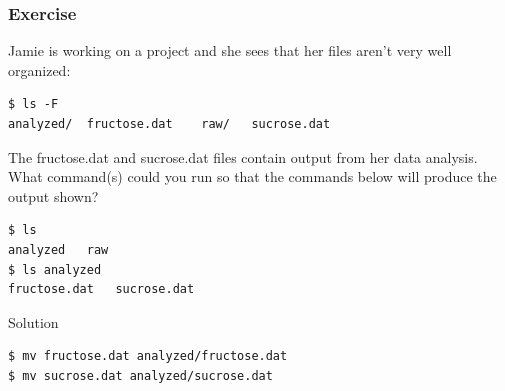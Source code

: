 \documentclass{beamer}
\begin{document}
\begin{frame}[fragile]
\frametitle{Exercise}
Jamie is working on a project and she sees that her files aren’t very well organized:
\begin{verbatim}
$ ls -F
analyzed/  fructose.dat    raw/   sucrose.dat
\end{verbatim}
The fructose.dat and sucrose.dat files contain output from her data analysis.
What command(s) could you run so that the commands below will produce the output shown?
\begin{verbatim}
$ ls
analyzed   raw
$ ls analyzed
fructose.dat   sucrose.dat
\end{verbatim}

\begin{block}{Solution}
\begin{verbatim}
$ mv fructose.dat analyzed/fructose.dat
$ mv sucrose.dat analyzed/sucrose.dat
\end{verbatim}
\end{block}
\end{frame}

\end{document}
